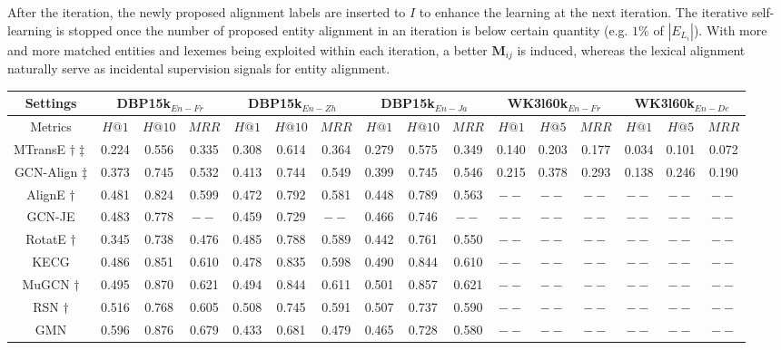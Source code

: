 \documentclass[11pt,a4paper]{article}
\makeatletter
\def\bhline{\specialrule{.2em}{0em}{0em}}
\def\hitsone{\mathit{H}\mbox{@}1}
\def\hitsfive{\mathit{H}\mbox{@}5}
\def\hitsten{\mathit{H}\mbox{@}10}
\def\mrr{\mathit{MRR}}
\makeatother
\begin{document}
After the iteration, the newly proposed alignment labels are inserted to $I$ to enhance the learning at the next iteration.
The iterative self-learning is stopped once the number of proposed entity alignment in an iteration is below certain quantity (e.g. $1\%$ of $|E_{L_i}|$).
With more and more matched entities and lexemes being exploited within each iteration,
a better $\mathbf{M}_{ij}$ is induced, whereas the lexical alignment naturally serve as incidental supervision signals for entity alignment.

{
\begin{table*}[t]
\setlength\tabcolsep{2pt}
\centering
\scriptsize
\begin{tabular}{c|ccc|ccc|ccc|ccc|ccc}
\bhline
Settings&\multicolumn{3}{c|}{DBP15k$_{En-Fr}$}&\multicolumn{3}{c|}{DBP15k$_{En-Zh}$}&\multicolumn{3}{c|}{DBP15k$_{En-Ja}$}&\multicolumn{3}{c|}{WK3l60k$_{En-Fr}$}&\multicolumn{3}{c}{WK3l60k$_{En-De}$}\\
\hline
Metrics&$\hitsone$&$\hitsten$&$\mrr$&$\hitsone$&$\hitsten$&$\mrr$&$\hitsone$&$\hitsten$&$\mrr$&$\hitsone$&$\hitsfive$&$\mrr$&$\hitsone$&$\hitsfive$&$\mrr$\\
\bhline
MTransE \cite{chen2017multigraph}$\dagger\ddagger$&0.224&0.556&0.335&0.308&0.614&0.364&0.279&0.575&0.349&0.140&0.203&0.177&0.034&0.101&0.072\\
GCN-Align \cite{wang2018cross}$\ddagger$&0.373&0.745&0.532&0.413&0.744&0.549&0.399&0.745&0.546&0.215&0.378&0.293&0.138&0.246&0.190\\
AlignE \cite{sun2018bootstrapping}$\dagger$&0.481&0.824&0.599&0.472&0.792&0.581&0.448&0.789&0.563&$--$&$--$&$--$&$--$&$--$&$--$\\
GCN-JE \cite{wu2019jointly}&0.483&0.778&$--$&0.459&0.729&$--$&0.466&0.746&$--$&$--$&$--$&$--$&$--$&$--$&$--$\\
RotatE \cite{sun2019rotate}$\dagger$&0.345&0.738&0.476&0.485&0.788&0.589&0.442&0.761&0.550&$--$&$--$&$--$&$--$&$--$&$--$\\
KECG \cite{li2019semi}&0.486&0.851&0.610&0.478&0.835&0.598&0.490&0.844&0.610&$--$&$--$&$--$&$--$&$--$&$--$\\
MuGCN \cite{cao2019multi}$\dagger$&0.495&0.870&0.621&0.494&0.844&0.611&0.501&0.857&0.621&$--$&$--$&$--$&$--$&$--$&$--$\\
RSN \cite{guo2019learning}$\dagger$&0.516&0.768&0.605&0.508&0.745&0.591&0.507&0.737&0.590&$--$&$--$&$--$&$--$&$--$&$--$\\
GMN \cite{xu2019cross}&0.596&0.876&0.679&0.433&0.681&0.479&0.465&0.728&0.580&$--$&$--$&$--$&$--$&$--$&$--$\\

\end{tabular}
\end{table*}}
\end{document}
